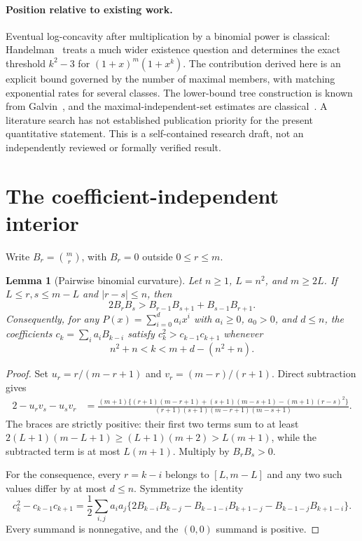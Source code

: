 \documentclass[11pt]{article}
\newtheorem{lemma}[theorem]{Lemma}
\begin{document}
\paragraph{Position relative to existing work.}
Eventual log-concavity after multiplication by a binomial power is
classical: Handelman~\cite{H92,H11} treats a much wider existence question
and determines the exact threshold $k^2-3$ for $(1+x)^m(1+x^k)$.
The contribution derived here is an explicit bound governed by the
number of maximal members, with matching exponential rates for several
classes. The lower-bound tree construction is known from Galvin~\cite{G},
and the maximal-independent-set estimates are classical~\cite{PP}.
A literature search has not established publication priority for the
present quantitative statement. This is a self-contained research draft,
not an independently reviewed or formally verified result.

\section{The coefficient-independent interior}
Write $B_r=\binom mr$, with $B_r=0$ outside $0\le r\le m$.

\begin{lemma}[Pairwise binomial curvature]\label{lem:interior}
Let $n\ge1$, $L=n^2$, and $m\ge2L$. If
$L\le r,s\le m-L$ and $|r-s|\le n$, then
\[
 2B_rB_s>B_{r-1}B_{s+1}+B_{s-1}B_{r+1}.
\]
Consequently, for any $P(x)=\sum_{i=0}^{d}a_ix^i$ with $a_i\ge0$,
$a_0>0$, and $d\le n$, the coefficients
$c_k=\sum_i a_iB_{k-i}$ satisfy $c_k^2>c_{k-1}c_{k+1}$ whenever
\[
 n^2+n<k<m+d-(n^2+n).
\]
\end{lemma}
\begin{proof}
Set $u_r=r/(m-r+1)$ and $v_r=(m-r)/(r+1)$. Direct subtraction gives
\begin{align*}
 2-u_rv_s-u_sv_r
 &=\frac{(m+1)\{(r+1)(m-r+1)+(s+1)(m-s+1)
                  -(m+1)(r-s)^2\}}
 {(r+1)(s+1)(m-r+1)(m-s+1)}.
\end{align*}
The braces are strictly positive: their first two terms sum to at least
$2(L+1)(m-L+1)\ge(L+1)(m+2)>L(m+1)$, while the subtracted term is at most
$L(m+1)$. Multiply by $B_rB_s>0$.

For the consequence, every $r=k-i$ belongs to $[L,m-L]$ and any two
such values differ by at most $d\le n$. Symmetrize the identity
\[
 c_k^2-c_{k-1}c_{k+1}
 =\frac12\sum_{i,j}a_ia_j
 \{2B_{k-i}B_{k-j}-B_{k-1-i}B_{k+1-j}-B_{k-1-j}B_{k+1-i}\}.
\]
Every summand is nonnegative, and the $(0,0)$ summand is positive.
\end{proof}
\end{document}

